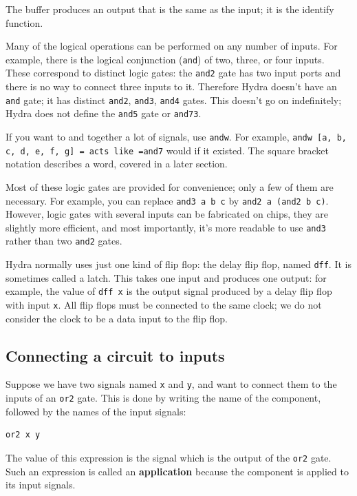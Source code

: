 \documentclass[]{svmono}
\begin{document}
The buffer produces an output that is the same as the input; it is the
identify function.


Many of the logical operations can be performed on any number of
inputs.  For example, there is the logical conjunction (\texttt{and}) of two,
three, or four inputs.  These correspond to distinct logic gates: the
\texttt{and2} gate has two input ports and there is no way to connect three
inputs to it.  Therefore Hydra doesn't have an \texttt{and} gate; it has
distinct \texttt{and2}, \texttt{and3}, \texttt{and4} gates.  This doesn't go on
indefinitely; Hydra does not define the \texttt{and5} gate or  \texttt{and73}.

If you want to and together a lot of signals, use \texttt{andw}.  For
example, \texttt{andw [a, b, c, d, e, f, g] = acts like =and7} would if it
existed.  The square bracket notation describes a word, covered in a
later section.

Most of these logic gates are provided for convenience; only a few of
them are necessary.  For example, you can replace \texttt{and3 a b c} by
\texttt{and2 a (and2 b c)}.  However, logic gates with several inputs can be
fabricated on chips, they are slightly more efficient, and most
importantly, it's more readable to use \texttt{and3} rather than two \texttt{and2}
gates.

Hydra normally uses just one kind of flip flop: the delay flip flop,
named \texttt{dff}.  It is sometimes called a latch.  This takes one input
and produces one output: for example, the value of \texttt{dff x} is the
output signal produced by a delay flip flop with input \texttt{x}.  All flip
flops must be connected to the same clock; we do not consider the
clock to be a data input to the flip flop.
\subsection*{Connecting a circuit to inputs}
\label{sec:org333c5a2}

Suppose we have two signals named \texttt{x} and \texttt{y}, and want to connect
them to the inputs of an \texttt{or2} gate.  This is done by writing the name
of the component, followed by the names of the input signals:

\begin{verbatim}
or2 x y
\end{verbatim}

The value of this expression is the signal which is the output of the
\texttt{or2} gate.  Such an expression is called an \textbf{application} because the
component is applied to its input signals.
\end{document}
